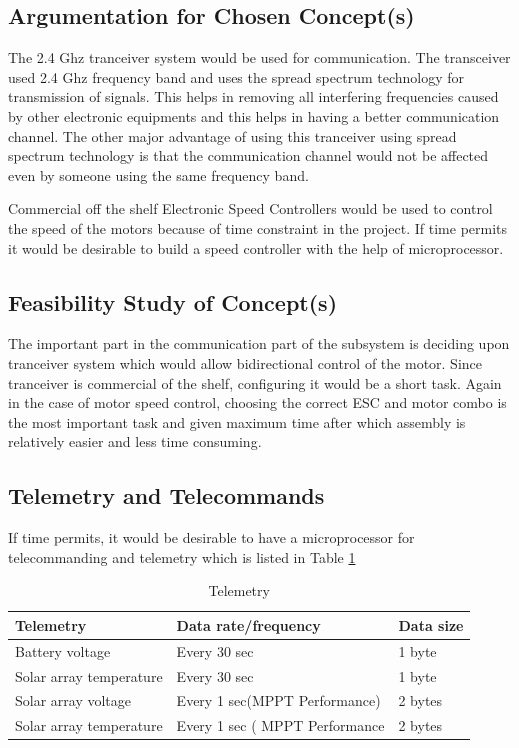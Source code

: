 \subsection{Argumentation for Chosen Concept(s)}

The 2.4 Ghz tranceiver system would be used for communication. The transceiver used 2.4 Ghz frequency band and uses the spread spectrum technology for transmission of signals. This helps in removing all interfering frequencies caused by other electronic equipments and this helps in having a better communication channel. The other major advantage of using this tranceiver using spread spectrum technology is that the communication channel would not be affected even by someone using the same frequency band.

Commercial off the shelf Electronic Speed Controllers would be used to control the speed of the motors because of time constraint in the project. If time permits it would be desirable to build a speed controller with the help of microprocessor.

\subsection{Feasibility Study of Concept(s)}

The important part in the communication part of the subsystem is deciding upon tranceiver system which would allow bidirectional control of the motor. Since tranceiver is commercial of the shelf, configuring it would be a short task.
Again in the case of motor speed control, choosing the correct ESC and motor combo is the most important task and given maximum time after which assembly is relatively easier and less time consuming.

\subsection{Telemetry and Telecommands}

If time permits, it would be desirable to have a microprocessor for telecommanding and telemetry  which is listed in Table \ref{tab:Telemetry}

\begin{table}[h]
\centering
\begin{tabular}{|l|l|l|}
\hline
\textbf{Telemetry} & \textbf{Data rate/frequency} & \textbf{Data size} \\
\hline
Battery voltage & Every 30 sec & 1 byte \\
\hline
Solar array temperature & Every 30 sec & 1 byte\\
\hline
Solar array voltage & Every 1 sec(MPPT Performance) & 2 bytes\\
\hline
Solar array temperature & Every 1 sec ( MPPT Performance & 2 bytes\\
\hline

\end{tabular}
\caption{Telemetry}
\label{tab:Telemetry}
\end{table}

